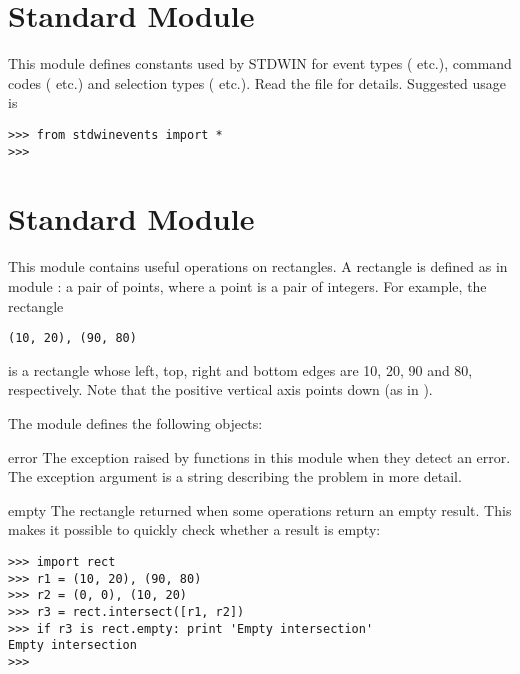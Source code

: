 \section{Standard Module }
\label{module-stdwinevents}

This module defines constants used by STDWIN for event types
( etc.), command codes ( etc.)
and selection types ( etc.).
Read the file for details.
Suggested usage is

\begin{verbatim}
>>> from stdwinevents import *
>>> 
\end{verbatim}
%
\section{Standard Module }
\label{module-rect}

This module contains useful operations on rectangles.
A rectangle is defined as in module
:
a pair of points, where a point is a pair of integers.
For example, the rectangle

\begin{verbatim}
(10, 20), (90, 80)
\end{verbatim}
%
is a rectangle whose left, top, right and bottom edges are 10, 20, 90
and 80, respectively.
Note that the positive vertical axis points down (as in
).

The module defines the following objects:

\begin{excdesc}{error}
The exception raised by functions in this module when they detect an
error.
The exception argument is a string describing the problem in more
detail.
\end{excdesc}

\begin{datadesc}{empty}
The rectangle returned when some operations return an empty result.
This makes it possible to quickly check whether a result is empty:

\begin{verbatim}
>>> import rect
>>> r1 = (10, 20), (90, 80)
>>> r2 = (0, 0), (10, 20)
>>> r3 = rect.intersect([r1, r2])
>>> if r3 is rect.empty: print 'Empty intersection'
Empty intersection
>>> 
\end{verbatim}
\end{datadesc}

